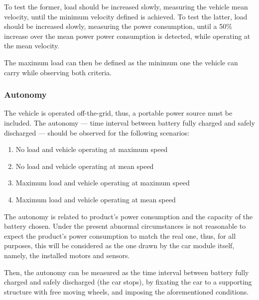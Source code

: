 To test the former, load should be increased slowly, measuring the vehicle
mean velocity, until the minimum velocity defined is achieved. To test the
latter, load should be increased slowly, measuring the power consumption, until
a 50\% increase over the mean power power consumption is detected, while
operating at the mean velocity.

The maximum load can then be defined as the minimum one the vehicle can carry
while observing both criteria.

\subsubsection{Autonomy}%
\label{sec:org532616f}
The vehicle is operated off-the-grid, thus, a portable power source must be
included. The autonomy --- time interval between battery fully charged and
safely discharged --- should be observed for the following scenarios:
\begin{enumerate}
\item No load and vehicle operating at maximum speed
\item No load and vehicle operating at mean speed
\item Maximum load and vehicle operating at maximum speed
\item Maximum load and vehicle operating at mean speed
\end{enumerate}
The autonomy is related to product's power consumption and the capacity of the
battery chosen. Under the present abnormal circumstances is not reasonable to
expect the product's power consumption to match the real one, thus, for all
purposes, this will be considered as the one drawn by the car module itself,
namely, the installed motors and sensors.

Then, the autonomy can be measured as
the time interval between battery fully charged and safely discharged (the car
stops), by fixating the car to a supporting structure with free moving wheels,
and imposing the aforementioned conditions.

